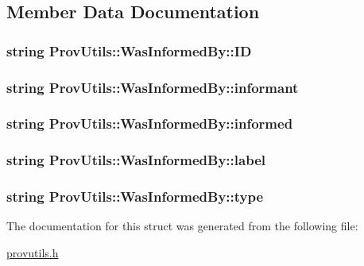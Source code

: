 \subsection{Member Data Documentation}
\hypertarget{struct_prov_utils_1_1_was_informed_by_ad3d5d14bb09c1bab4e5218ca30d60b14}{
\subsubsection[{I\-D}]{\setlength{\rightskip}{0pt plus 5cm}string Prov\-Utils\-::\-Was\-Informed\-By\-::\-I\-D}}\label{struct_prov_utils_1_1_was_informed_by_ad3d5d14bb09c1bab4e5218ca30d60b14}
\hypertarget{struct_prov_utils_1_1_was_informed_by_a614d109abfeacef33acff0701784efa9}{
\subsubsection[{informant}]{\setlength{\rightskip}{0pt plus 5cm}string Prov\-Utils\-::\-Was\-Informed\-By\-::informant}}\label{struct_prov_utils_1_1_was_informed_by_a614d109abfeacef33acff0701784efa9}
\hypertarget{struct_prov_utils_1_1_was_informed_by_ac34a2f8f42c52c7a1bf240182cb1070b}{
\subsubsection[{informed}]{\setlength{\rightskip}{0pt plus 5cm}string Prov\-Utils\-::\-Was\-Informed\-By\-::informed}}\label{struct_prov_utils_1_1_was_informed_by_ac34a2f8f42c52c7a1bf240182cb1070b}
\hypertarget{struct_prov_utils_1_1_was_informed_by_adaa45666484c33890b6c384736c63898}{
\subsubsection[{label}]{\setlength{\rightskip}{0pt plus 5cm}string Prov\-Utils\-::\-Was\-Informed\-By\-::label}}\label{struct_prov_utils_1_1_was_informed_by_adaa45666484c33890b6c384736c63898}
\hypertarget{struct_prov_utils_1_1_was_informed_by_a5ab1cf3b00d8c91ba8f6ce3c862cc1c4}{
\subsubsection[{type}]{\setlength{\rightskip}{0pt plus 5cm}string Prov\-Utils\-::\-Was\-Informed\-By\-::type}}\label{struct_prov_utils_1_1_was_informed_by_a5ab1cf3b00d8c91ba8f6ce3c862cc1c4}


The documentation for this struct was generated from the following file\-:\begin{DoxyCompactItemize}
\item 
\hyperlink{provutils_8h}{provutils.\-h}\end{DoxyCompactItemize}
